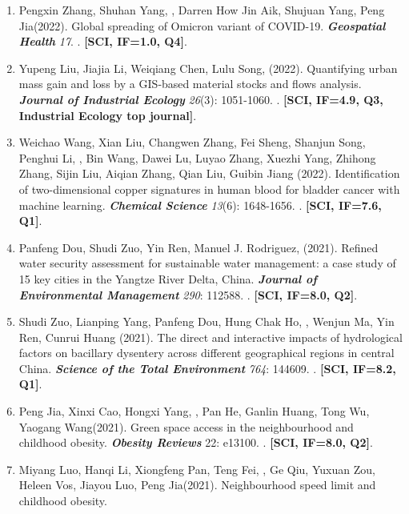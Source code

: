 \begin{enumerate}
\item
    Pengxin Zhang\CF, Shuhan Yang\CF, \Shaoqing, Darren How Jin Aik, Shujuan Yang, Peng Jia\CS (2022).
    Global spreading of Omicron variant of COVID-19.
    \textbf{\textit{Geospatial Health}} \textit{17}.
    . \textbf{[SCI, IF=1.0, Q4]}.
\item
    Yupeng Liu\CF, Jiajia Li\CF, Weiqiang Chen\CS, Lulu Song, \Shaoqing \enspace (2022).
    Quantifying urban mass gain and loss by a GIS‐based material stocks and flows analysis.
    \textbf{\textit{Journal of Industrial Ecology}} \textit{26}(3): 1051-1060.
    . \textbf{[SCI, IF=4.9, Q3, Industrial Ecology top journal]}.
\item
    Weichao Wang\CF, Xian Liu\CF, Changwen Zhang, Fei Sheng, Shanjun Song, Penghui Li, \Shaoqing, Bin Wang, Dawei Lu, Luyao Zhang, Xuezhi Yang, Zhihong Zhang, Sijin Liu, Aiqian Zhang, Qian Liu\CS, Guibin Jiang (2022).
    Identification of two-dimensional copper signatures in human blood for bladder cancer with machine learning.
    \textbf{\textit{Chemical Science}} \textit{13}(6): 1648-1656.
    . \textbf{[SCI, IF=7.6, Q1]}.
\item
    Panfeng Dou, Shudi Zuo\CS, Yin Ren\CS, Manuel J. Rodriguez, \Shaoqing \enspace (2021).
    Refined water security assessment for sustainable water management: a case study of 15 key cities in the Yangtze River Delta, China.
    \textbf{\textit{Journal of Environmental Management}} \textit{290}: 112588.
    . \textbf{[SCI, IF=8.0, Q2]}.
\item
    Shudi Zuo, Lianping Yang\CS, Panfeng Dou, Hung Chak Ho, \Shaoqing, Wenjun Ma, Yin Ren, Cunrui Huang (2021).
    The direct and interactive impacts of hydrological factors on bacillary dysentery across different geographical regions in central China.
    \textbf{\textit{Science of the Total Environment}} \textit{764}: 144609.
    . \textbf{[SCI, IF=8.2, Q1]}.
\item
    Peng Jia\CF, Xinxi Cao\CF, Hongxi Yang, \Shaoqing, Pan He, Ganlin Huang, Tong Wu, Yaogang Wang\CS (2021).
    Green space access in the neighbourhood and childhood obesity.
    \textbf{\textit{Obesity Reviews}} 22: e13100.
    . \textbf{[SCI, IF=8.0, Q2]}.
\item
    Miyang Luo, Hanqi Li, Xiongfeng Pan, Teng Fei, \Shaoqing, Ge Qiu, Yuxuan Zou, Heleen Vos, Jiayou Luo, Peng Jia\CS (2021).
    Neighbourhood speed limit and childhood obesity.

\end{enumerate}
